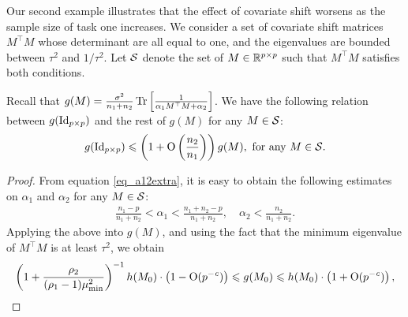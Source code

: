 \begin{example}
Our second example illustrates that the effect of covariate shift worsens as the sample size of task one increases.
We consider a set of covariate shift matrices $M^{\top} M$ whose determinant are all equal to one, and the eigenvalues are bounded between $\tau^2$ and $1 / \tau^2$.
Let $\mathcal{S}$ denote the set of $M\in\mathbb{R}^{p\times p}$ such that $M^{\top} M$ satisfies both conditions.
\begin{claim}\label{prop_covariate}
    Recall that $g(M) = \frac{\sigma^2}{n_1 + n_2} \operatorname{Tr}\left[\frac 1 {\alpha_1 M^{\top} M + \alpha_2}\right]$.
	We have the following relation between $g(\operatorname{Id}_{p \times p})$ and the rest of $g(M)$ for any $M \in\mathcal{S}$:
	\[ g(\operatorname{Id}_{p\times p}) \leqslant \left({1+ \operatorname{O}\left(\frac{n_2}{n_1}  \right)}\right) g(M), \text{ for any } M \in \mathcal{S}. \]
\end{claim}
\begin{proof}
    From equation \eqref{eq_a12extra}, it is easy to obtain the following estimates on $\alpha_1$ and $\alpha_2$ for any $M\in \mathcal{S}$:
    \begin{align*}%
        \frac{n_1 - p}{n_1 + n_2} < \alpha_1 <  \frac{n_1 + n_2 - p}{n_1 + n_2},\quad \alpha_2 < \frac{n_2}{n_1 + n_2}.
    \end{align*}
    Applying the above into $g(M)$, and using the fact that the minimum eigenvalue of $ M^\top M$ is at least $\tau^2$, we obtain
    \begin{align}\label{approximateteM}
    \left(1+\frac{\rho_2}{(\rho_1-1)\mu_{\min}^2}\right)^{-1}h(M_0) \cdot \left(1 - \OO(p^{-\e})\right) \le g(M_0) \le h(M_0) \cdot \left(1 +\OO(p^{-\e})\right),

\end{align}
\end{proof}
\end{example}
